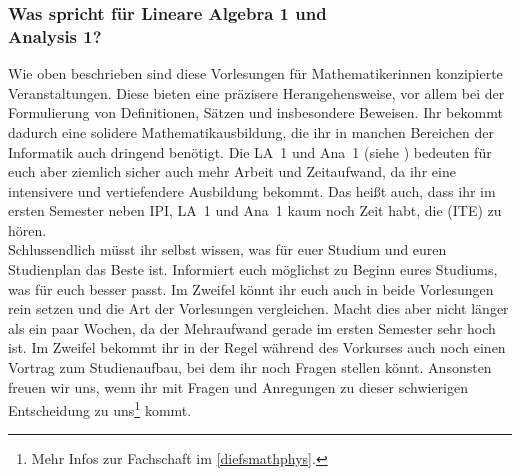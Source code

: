 \vspace{-1mm}
\subsubsection{Was spricht für Lineare Algebra 1 und\\Analysis 1?}
Wie oben beschrieben sind diese Vorlesungen für Mathematikerinnen konzipierte Veranstaltungen. Diese bieten eine präzisere Herangehensweise, vor allem bei der Formulierung von Definitionen, Sätzen und insbesondere Beweisen. Ihr bekommt dadurch eine solidere Mathematikausbildung, die ihr in manchen Bereichen der Informatik auch dringend benötigt. Die \gls{LA}~1 und \gls{Ana}~1 (siehe ) bedeuten für euch aber ziemlich sicher auch mehr Arbeit und Zeitaufwand, da ihr eine intensivere und vertiefendere Ausbildung bekommt. Das heißt auch, dass ihr im ersten Semester neben \gls{IPI}, \gls{LA}~1 und \gls{Ana}~1 kaum noch Zeit habt, die  (\gls{ITE}) zu hören.\\

Schlussendlich müsst ihr selbst wissen, was für euer Studium und euren Studienplan das Beste ist. Informiert euch möglichst zu Beginn eures Studiums, was für euch besser passt. Im Zweifel könnt ihr euch auch in beide Vorlesungen rein setzen und die Art der Vorlesungen vergleichen. Macht dies aber nicht länger als ein paar Wochen, da der Mehraufwand gerade im ersten Semester sehr hoch ist. Im Zweifel bekommt ihr in der Regel während des Vorkurses auch noch einen Vortrag zum Studienaufbau, bei dem ihr noch Fragen stellen könnt. Ansonsten freuen wir uns, wenn ihr mit Fragen und Anregungen zu dieser schwierigen Entscheidung zu uns\footnote{Mehr Infos zur Fachschaft im \autoref{diefsmathphys}.} kommt.
